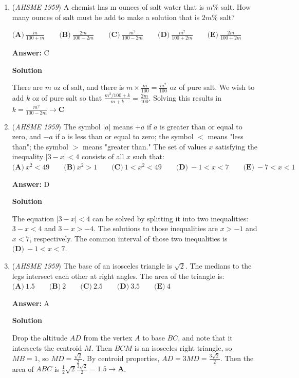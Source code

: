 \begin{enumerate}
 


	\item (\textit{AHSME 1959}) A chemist has m ounces of salt water that is $m$\% salt. How many ounces of salt must he add to make a solution that is $2m$\% salt?


 $\textbf{(A)}\ \frac{m}{100+m} \qquad\textbf{(B)}\ \frac{2m}{100-2m}\qquad\textbf{(C)}\ \frac{m^2}{100-2m}\qquad\textbf{(D)}\ \frac{m^2}{100+2m}\qquad\textbf{(E)}\ \frac{2m}{100+2m}$

 \textbf{Answer: }C



\textbf{Solution}

There are $m$ oz of salt, and there is $m\times\frac{m}{100}=\frac{m^2}{100}$ oz of pure salt. We wish to add $k$ oz of pure salt so that $\frac{m^2/100+k}{m+k}=\frac{2m}{100}$. Solving this results in $k=\frac{m^2}{100-2m}\rightarrow\boxed{\textbf{C}}$



	\item (\textit{AHSME 1959}) The symbol $|a|$ means $+a$ if $a$ is greater than or equal to zero, and $-a$ if a is less than or equal to zero; the symbol $<$ means "less than"; 
the symbol $>$ means "greater than."
The set of values $x$ satisfying the inequality $|3-x|<4$ consists of all $x$ such that:
$\textbf{(A)}\ x^2<49 \qquad\textbf{(B)}\ x^2>1 \qquad\textbf{(C)}\ 1<x^2<49\qquad\textbf{(D)}\ -1<x<7\qquad\textbf{(E)}\ -7<x<1$

 \textbf{Answer: }D



\textbf{Solution}

The equation $|3-x| < 4$ can be solved by splitting it into two inequalities: $3-x<4$ and $3-x>-4$. The solutions to those inequalities are $x>-1$ and $x<7$, respectively. The common interval of those two inequalities is $\boxed{\textbf{(D)}\ -1<x<7}$.

 


	\item (\textit{AHSME 1959}) The base of an isosceles triangle is $\sqrt 2$. The medians to the legs intersect each other at right angles. The area of the triangle is:
$\textbf{(A)}\ 1.5 \qquad\textbf{(B)}\ 2\qquad\textbf{(C)}\ 2.5\qquad\textbf{(D)}\ 3.5\qquad\textbf{(E)}\ 4$

 \textbf{Answer: }A



\textbf{Solution}

Drop the altitude $AD$ from the vertex $A$ to base $BC$, and note that it intersects the centroid $M$. Then $BCM$ is an isosceles right triangle, so $MB=1$, so $MD=\frac{\sqrt{2}}{2}$. By centroid properties, $AD=3MD=\frac{3\sqrt2}{2}$. Then the area of $ABC$ is $\frac12\sqrt{2}\frac{3\sqrt2}{2}=1.5\rightarrow\boxed{\textbf{A}}$.


\end{enumerate}
